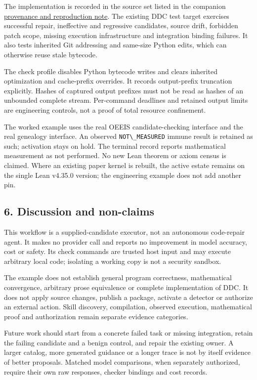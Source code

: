 \documentclass[
  11pt,
]{article}
\newcommand{\passthrough}[1]{#1}
\begin{document}
The implementation is recorded in the source set listed in the companion
\href{docs/reproduction.md}{provenance and reproduction note}. The
existing DDC test target exercises successful repair, ineffective and
regressive candidates, source drift, forbidden patch scope, missing
execution infrastructure and integration binding failures. It also tests
inherited Git addressing and same-size Python edits, which can otherwise
reuse stale bytecode.

The check profile disables Python bytecode writes and clears inherited
optimization and cache-prefix overrides. It records output-prefix
truncation explicitly. Hashes of captured output prefixes must not be
read as hashes of an unbounded complete stream. Per-command deadlines
and retained output limits are engineering controls, not a proof of
total resource confinement.

The worked example uses the real OEEIS candidate-checking interface and
the real genealogy interface. An observed
\passthrough{\lstinline!NOT\_MEASURED!} immune result is retained as
such; activation stays on hold. The terminal record reports mathematical
measurement as not performed. No new Lean theorem or axiom census is
claimed. Where an existing paper kernel is rebuilt, the active estate
remains on the single Lean v4.35.0 version; the engineering example does
not add another pin.

\subsection{6. Discussion and
non-claims}\label{discussion-and-non-claims}

This workflow is a supplied-candidate executor, not an autonomous
code-repair agent. It makes no provider call and reports no improvement
in model accuracy, cost or safety. Its check commands are trusted host
input and may execute arbitrary local code; isolating a working copy is
not a security sandbox.

The example does not establish general program correctness, mathematical
convergence, arbitrary prose equivalence or complete implementation of
DDC. It does not apply source changes, publish a package, activate a
detector or authorize an external action. Skill discovery, compilation,
observed execution, mathematical proof and authorization remain separate
evidence categories.

Future work should start from a concrete failed task or missing
integration, retain the failing candidate and a benign control, and
repair the existing owner. A larger catalog, more generated guidance or
a longer trace is not by itself evidence of better proposals. Matched
model comparisons, when separately authorized, require their own raw
responses, checker bindings and cost records.
\end{document}
